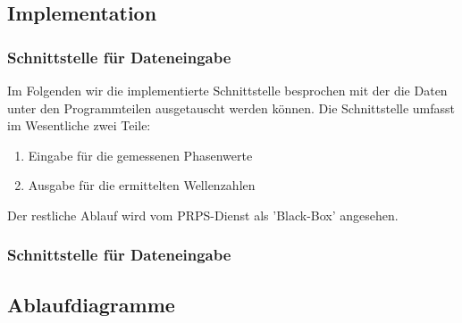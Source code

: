 \lipsum[1-2]
%
\subsection{Implementation}
\lipsum[1-3]
\subsubsection{Schnittstelle für Dateneingabe}
Im Folgenden wir die implementierte Schnittstelle besprochen mit der die Daten unter den Programmteilen ausgetauscht werden können. Die Schnittstelle umfasst im Wesentliche zwei Teile:
\begin{enumerate}
	\item Eingabe für die gemessenen Phasenwerte
	\item Ausgabe für die ermittelten Wellenzahlen
\end{enumerate}
%
Der restliche Ablauf wird vom PRPS-Dienst als 'Black-Box' angesehen.\\
%
\subsubsection{Schnittstelle für Dateneingabe}
%
\subsection{Ablaufdiagramme}
%

%

%


\lipsum[1-5]